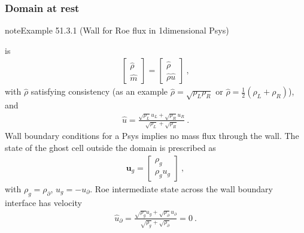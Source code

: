 \documentclass[letterpaper,10pt,english]{jupyterBook}
\begin{document}
\subsubsection{Domain at rest}
\label{\detokenize{ch/pde/fvm-hyperbolic-bc:domain-at-rest}}\label{ch/pde/fvm-hyperbolic-bc:example-0}
\begin{sphinxadmonition}{note}{Example 51.3.1 (Wall for Roe flux in 1\sphinxhyphen{}dimensional P\sphinxhyphen{}sys)}



\sphinxAtStartPar
{} is
\begin{equation*}
\begin{split}\begin{bmatrix} \hat{\rho} \\ \hat{m} \end{bmatrix} = \begin{bmatrix} \hat{\rho} \\ \hat{\rho} \hat{u} \end{bmatrix} \ ,\end{split}
\end{equation*}
\sphinxAtStartPar
with \(\hat{\rho}\) satisfying consistency (as an example \(\hat{\rho} = \sqrt{\rho_L \rho_R}\) or \(\hat{\rho} = \frac{1}{2} \left( \rho_L + \rho_R \right)\)), and
\begin{equation*}
\begin{split}\hat{u} = \frac{\sqrt{\rho_L} u_L + \sqrt{\rho_R} u_R}{\sqrt{\rho_L}+\sqrt{\rho_R}} \ .\end{split}
\end{equation*}
\sphinxAtStartPar
Wall boundary conditions for a P\sphinxhyphen{}sys implies no mass flux through the wall. The state of the ghost cell outside the domain is prescribed as
\begin{equation*}
\begin{split}\mathbf{u}_{g} = \begin{bmatrix} \rho_{g} \\ \rho_{g} u_{g} \end{bmatrix} \ ,\end{split}
\end{equation*}
\sphinxAtStartPar
with \(\rho_{g} = \rho_{\partial}\), \(u_{g} = - u_{\partial}\). Roe intermediate state across the wall boundary interface has velocity
\begin{equation*}
\begin{split}\hat{u}_{\partial} = \frac{\sqrt{\rho_g} u_g + \sqrt{\rho_{\partial}} u_{\partial}}{\sqrt{\rho_g} + \sqrt{\rho_{\partial}}} = 0 \ .\end{split}

\end{equation*}
\end{sphinxadmonition}
\end{document}
